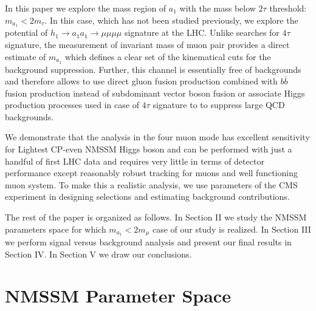 \documentclass[aps,prl,twocolumn,nofootinbib,superscriptaddress]{revtex4}
\begin{document}
In this paper we explore the  mass region of  $a_1$ 
with the mass below $2\tau$ threshold: $m_{a_1}<2m_\tau$.
In this case, which has not been studied previously, we 
explore the potential of $h_1 \to a_1a_1 \to \mu \mu \mu \mu$ signature at the LHC.
Unlike searches for $4\tau$ signature,
the measurement of invariant mass of muon pair provides a 
direct estimate of $m_{a_1}$ which defines a clear set of the kinematical
cuts for the background suppression. 
Further, this
channel is essentially free of backgrounds and therefore allows to use
direct gluon fusion production combined with  $b\bar{b}$ fusion production
instead of subdominant  vector boson fusion or associate 
Higgs production processes used in case of $4\tau$ signature to to suppress large QCD
backgrounds.

We demonstrate that the analysis in
the four muon mode has excellent sensitivity for Lightest CP-even NMSSM Higgs boson
and can be performed with just  a handful of first LHC data and requires 
very little in terms of detector performance  except reasonably robust tracking 
for muons and well functioning muon system. To make 
this a realistic analysis, we use parameters of the CMS experiment in designing
selections and estimating background contributions.

The rest of the paper is organized as follows.
In Section II we study the NMSSM parameters space 
for which $m_{a_1}<2m_\mu$ case of our study is realized.
In Section III we perform signal versus background analysis
and present our final  results in Section IV.
In Section V we draw our conclusions.



\section{NMSSM Parameter Space}
\end{document}
